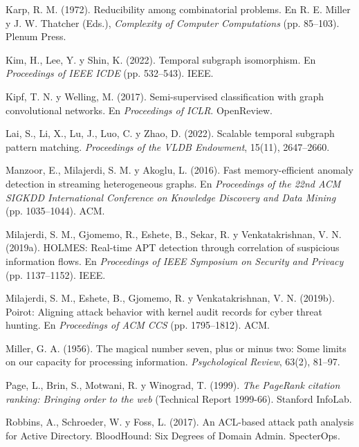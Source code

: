 \documentclass[11pt,a4paper]{article}
\begin{document}
\begin{list}{}{\setlength{\leftmargin}{1.5em}\setlength{\itemindent}{-1.5em}
\setlength{\itemsep}{2pt}}
\item Karp, R. M. (1972). Reducibility among combinatorial problems. En R. E.
Miller y J. W. Thatcher (Eds.), \emph{Complexity of Computer Computations} (pp.
85--103). Plenum Press.

\item Kim, H., Lee, Y. y Shin, K. (2022). Temporal subgraph isomorphism. En
\emph{Proceedings of IEEE ICDE} (pp. 532--543). IEEE.

\item Kipf, T. N. y Welling, M. (2017). Semi-supervised classification with
graph convolutional networks. En \emph{Proceedings of ICLR}. OpenReview.

\item Lai, S., Li, X., Lu, J., Luo, C. y Zhao, D. (2022). Scalable temporal
subgraph pattern matching. \emph{Proceedings of the VLDB Endowment}, 15(11),
2647--2660.

\item Manzoor, E., Milajerdi, S. M. y Akoglu, L. (2016). Fast memory-efficient
anomaly detection in streaming heterogeneous graphs. En \emph{Proceedings of
the 22nd ACM SIGKDD International Conference on Knowledge Discovery and Data
Mining} (pp. 1035--1044). ACM.

\item Milajerdi, S. M., Gjomemo, R., Eshete, B., Sekar, R. y Venkatakrishnan,
V. N. (2019a). HOLMES: Real-time APT detection through correlation of
suspicious information flows. En \emph{Proceedings of IEEE Symposium on
Security and Privacy} (pp. 1137--1152). IEEE.

\item Milajerdi, S. M., Eshete, B., Gjomemo, R. y Venkatakrishnan, V. N.
(2019b). Poirot: Aligning attack behavior with kernel audit records for cyber
threat hunting. En \emph{Proceedings of ACM CCS} (pp. 1795--1812). ACM.

\item Miller, G. A. (1956). The magical number seven, plus or minus two: Some
limits on our capacity for processing information. \emph{Psychological Review},
63(2), 81--97.

\item Page, L., Brin, S., Motwani, R. y Winograd, T. (1999). \emph{The PageRank
citation ranking: Bringing order to the web} (Technical Report 1999-66).
Stanford InfoLab.

\item Robbins, A., Schroeder, W. y Foss, L. (2017). An ACL-based attack path
analysis for Active Directory. BloodHound: Six Degrees of Domain Admin.
SpecterOps.


\end{list}
\end{document}
